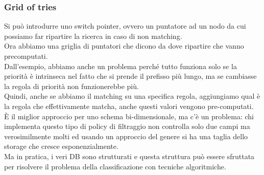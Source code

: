 \documentclass[12pt, oneside]{extbook} %
\begin{document}
\subsubsection{Grid of tries}
Si può introdurre uno switch pointer, ovvero un puntatore ad un nodo da cui possiamo far ripartire la ricerca in caso di non matching.
\\Ora abbiamo una griglia di puntatori che dicono da dove ripartire che vanno precomputati.
\\Dall'esempio, abbiamo anche un problema perché tutto funziona solo se la priorità è intrinseca nel fatto che si prende il prefisso più lungo, ma se cambiasse la regola di priorità non funzionerebbe più.
\\Quindi, anche se abbiamo il matching su una specifica regola, aggiungiamo qual è la regola che effettivamente matcha, anche questi valori vengono pre-computati.
\\È il miglior approccio per uno schema bi-dimensionale, ma c'è un problema: chi implementa questo tipo di policy di filtraggio non controlla solo due campi ma verosimilmente molti ed usando un approccio del genere si ha una taglia dello storage che cresce esponenzialmente.
\\Ma in pratica, i veri DB sono strutturati e questa struttura può essere sfruttata per risolvere il problema della classificazione con tecniche algoritmiche.
\end{document}

